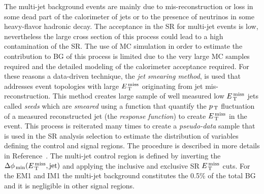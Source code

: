 The multi-jet background events are mainly due to mis-reconstruction or loss in
some dead part of the calorimeter of jets or to the presence of neutrinos in
some heavy-flavor hadronic decay. The acceptance in the SR for multi-jet events
is low, nevertheless the large cross section of this process could lead to a
high contamination of the SR\@. The use of MC simulation in order to estimate
the contribution to BG of this process is limited due to the very large MC
samples required and the detailed modeling of the calorimeter acceptance
required. For these reasons a data-driven technique, the \emph{jet smearing
  method}, is used that addresses event topologies with large $E_\mathrm{\, T}^\mathrm{\, miss}$ originating
from jet mis-reconstruction. This method creates large sample of well measured
low $E_\mathrm{\, T}^\mathrm{\, miss}$ jets called \emph{seeds} which are \emph{smeared} using a function
that quantify the $p_\mathrm{\, T}$ fluctuation of a measured reconstructed jet (the
\emph{response function}) to create $E_\mathrm{\, T}^\mathrm{\, miss}$ in the event. This process is
reiterated many times to create a \emph{pseudo-data} sample that is used in the
SR analysis selection to estimate the distribution of variables defining the
control and signal regions. The procedure is described in more details in
Reference~\cite{JetSmearing}. The multi-jet control region is defined by
inverting the $\Delta \phi_\mathrm{\, min} (E_\mathrm{\, T}^\mathrm{\, miss}, \mathrm{jet})$ and applying
the inclusive and exclusive SR $E_\mathrm{\, T}^\mathrm{\, miss}$ cuts. For the EM1 and IM1 the multi-jet
background constitutes the 0.5\% of the total BG and it is negligible in other
signal regions.

